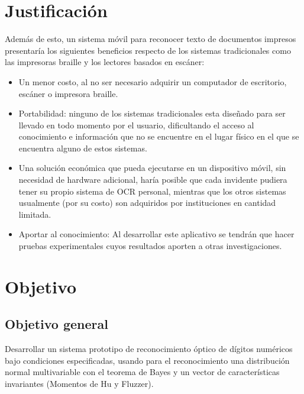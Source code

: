 \documentclass[a4paper, 11pt, oneside]{article}
\begin{document}
	\clearpage

	\section{Justificación}
	
	Además de esto, un sistema móvil para reconocer texto de documentos impresos presentaría los siguientes beneficios respecto de los sistemas tradicionales como las impresoras braille y los lectores basados en escáner:

	\begin{itemize} 

	\item Un menor costo, al no ser necesario adquirir un computador de escritorio, escáner o impresora braille.

	\item Portabilidad: ninguno de los sistemas tradicionales esta diseñado para ser llevado en todo momento por el usuario, dificultando el acceso al conocimiento e información que no se encuentre en el lugar físico en el que se encuentra alguno de estos sistemas.
	
	\item Una solución económica que pueda ejecutarse en un dispositivo móvil, sin necesidad de hardware adicional, haría posible que cada invidente pudiera tener su propio sistema de OCR personal, mientras que los otros sistemas usualmente (por su costo) son adquiridos por instituciones en cantidad limitada.

	\item Aportar al conocimiento: Al desarrollar este aplicativo se tendrán que hacer pruebas experimentales cuyos resultados aporten a otras investigaciones.
	\end{itemize}
	\clearpage

	\section{Objetivo}
	\subsection{Objetivo general}
	Desarrollar un sistema prototipo de reconocimiento óptico de dígitos numéricos bajo condiciones especificadas, 
	usando para el reconocimiento una distribución normal multivariable con el teorema de Bayes
	y un vector de características invariantes (Momentos de Hu y Fluzzer).
\end{document}
